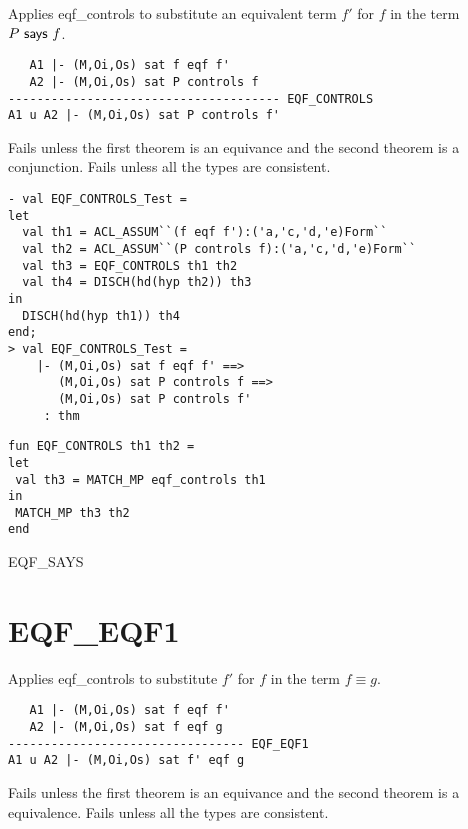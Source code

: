 \SYNOPSIS 
Applies eqf_controls to substitute an equivalent term $f'$ for
$f$ in the term $P \textsf{ says } f$.

\DESCRIBE
\begin{verbatim}
   A1 |- (M,Oi,Os) sat f eqf f'
   A2 |- (M,Oi,Os) sat P controls f
-------------------------------------- EQF_CONTROLS
A1 u A2 |- (M,Oi,Os) sat P controls f'
\end{verbatim}

\FAILURE 
Fails unless the first theorem is an equivance and the second
theorem is a conjunction.  Fails unless all the types are consistent.

\EXAMPLE
\begin{holboxed}
\begin{verbatim}
- val EQF_CONTROLS_Test =
let
  val th1 = ACL_ASSUM``(f eqf f'):('a,'c,'d,'e)Form``
  val th2 = ACL_ASSUM``(P controls f):('a,'c,'d,'e)Form``
  val th3 = EQF_CONTROLS th1 th2
  val th4 = DISCH(hd(hyp th2)) th3
in
  DISCH(hd(hyp th1)) th4
end;
> val EQF_CONTROLS_Test =
    |- (M,Oi,Os) sat f eqf f' ==>
       (M,Oi,Os) sat P controls f ==>
       (M,Oi,Os) sat P controls f'
     : thm
\end{verbatim}
\end{holboxed}

\IMPLEMENTATION
\begin{holboxed}
\begin{verbatim}
fun EQF_CONTROLS th1 th2 =
let
 val th3 = MATCH_MP eqf_controls th1
in
 MATCH_MP th3 th2
end
\end{verbatim}
\end{holboxed}

\SEEALSO
EQF\_SAYS
\ENDDOC

\section{EQF\_EQF1}



\egroup

\SYNOPSIS 
Applies eqf_controls to substitute $f'$ for $f$ in the term $f \equiv g$.

\DESCRIBE
\begin{verbatim}
   A1 |- (M,Oi,Os) sat f eqf f'
   A2 |- (M,Oi,Os) sat f eqf g
--------------------------------- EQF_EQF1
A1 u A2 |- (M,Oi,Os) sat f' eqf g
\end{verbatim}
\FAILURE
Fails unless the first theorem is an equivance and the second theorem is
a equivalence.  Fails unless all the types are consistent.


